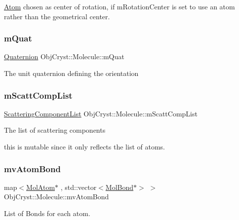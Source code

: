 \mbox{\hyperlink{class_obj_cryst_1_1_atom}{Atom}} chosen as center of rotation, if m\+Rotation\+Center is set to use an atom rather than the geometrical center. \mbox{\label{class_obj_cryst_1_1_molecule_a61b83701b288c4fdbcda97b14608af7d}} 
\subsubsection{\texorpdfstring{mQuat}{mQuat}}
{\footnotesize\ttfamily \mbox{\hyperlink{class_obj_cryst_1_1_quaternion}{Quaternion}} Obj\+Cryst\+::\+Molecule\+::m\+Quat}

The unit quaternion defining the orientation \mbox{\label{class_obj_cryst_1_1_molecule_ae681f50b04c32c7139727c675dc04b67}} 
\subsubsection{\texorpdfstring{mScattCompList}{mScattCompList}}
{\footnotesize\ttfamily \mbox{\hyperlink{class_obj_cryst_1_1_scattering_component_list}{Scattering\+Component\+List}} Obj\+Cryst\+::\+Molecule\+::m\+Scatt\+Comp\+List\hspace{0.3cm}{\ttfamily [mutable]}}

The list of scattering components

this is mutable since it only reflects the list of atoms. \mbox{\label{class_obj_cryst_1_1_molecule_ad67f767fe62aeef49aef1c5760d69294}} 
\subsubsection{\texorpdfstring{mvAtomBond}{mvAtomBond}}
{\footnotesize\ttfamily map$<$\mbox{\hyperlink{class_obj_cryst_1_1_mol_atom}{Mol\+Atom}}$\ast$ , std\+::vector$<$\mbox{\hyperlink{class_obj_cryst_1_1_mol_bond}{Mol\+Bond}}$\ast$$>$ $>$ Obj\+Cryst\+::\+Molecule\+::mv\+Atom\+Bond}

List of Bonds for each atom.

